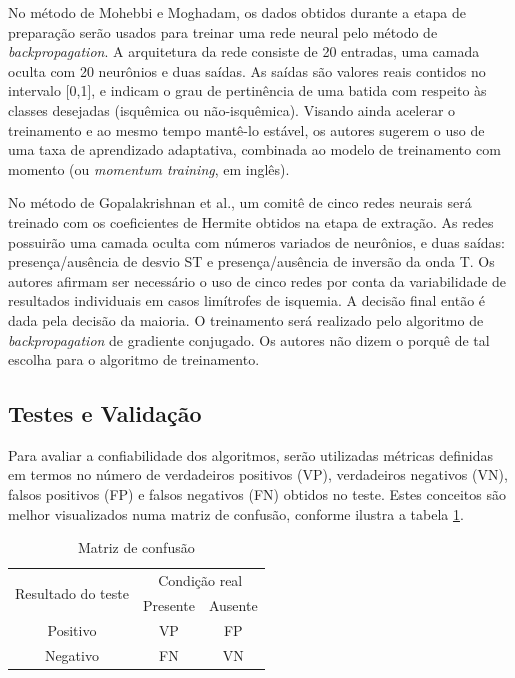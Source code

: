 No método de Mohebbi e Moghadam, os dados obtidos durante a etapa de preparação serão usados para treinar uma rede neural pelo método de \emph{backpropagation}. A arquitetura da rede consiste de 20 entradas, uma camada oculta com 20 neurônios e duas saídas. As saídas são valores reais contidos no intervalo [0,1], e indicam o grau de pertinência de uma batida com respeito às classes desejadas (isquêmica ou não-isquêmica). Visando ainda acelerar o treinamento e ao mesmo tempo mantê-lo estável, os autores sugerem o uso de uma taxa de aprendizado adaptativa, combinada ao modelo de treinamento com momento (ou \emph{momentum training}, em inglês).

No método de Gopalakrishnan et al., um comitê de cinco redes neurais será treinado com os coeficientes de Hermite obtidos na etapa de extração. As redes possuirão uma camada oculta com números variados de neurônios, e duas saídas: presença/ausência de desvio ST e presença/ausência de inversão da onda T. Os autores afirmam ser necessário o uso de cinco redes por conta da variabilidade de resultados individuais em casos limítrofes de isquemia. A decisão final então é dada pela decisão da maioria. O treinamento será realizado pelo algoritmo de \emph{backpropagation} de gradiente conjugado. Os autores não dizem o porquê de tal escolha para o algoritmo de treinamento.

\subsection{Testes e Validação}
\label{sec:section5_2}
Para avaliar a confiabilidade dos algoritmos, serão utilizadas métricas definidas em termos no número de verdadeiros positivos (VP), verdadeiros negativos (VN), falsos positivos (FP) e falsos negativos (FN) obtidos no teste. Estes conceitos são melhor visualizados numa matriz de confusão, conforme ilustra a tabela \ref{tab:confusion_matrix}.

\begin{table}[ht] 
    \caption{Matriz de confusão}
    \centering
    \begin{tabular}{ccc}
        \toprule
        \multirow{2}{2cm}{Resultado do teste} &
        \multicolumn{2}{c}{Condição real} \\
        \cmidrule{2-3}
        & Presente & Ausente \\ 
        \midrule
        Positivo & VP & FP \\
        \midrule
        Negativo & FN & VN \\
        \bottomrule
    \end{tabular} 
    \label{tab:confusion_matrix}
\end{table}

